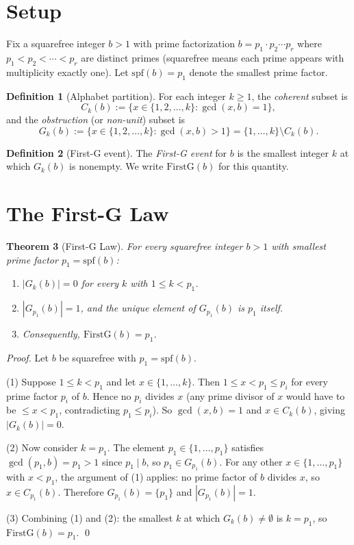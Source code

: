 \documentclass[11pt,reqno]{amsart}
\theoremstyle{plain}
\newtheorem{theorem}{Theorem}
\theoremstyle{definition}
\newtheorem{definition}[theorem]{Definition}
\begin{document}
\section{Setup}

Fix a squarefree integer $b > 1$ with prime factorization
$b = p_1 \cdot p_2 \cdots p_r$ where $p_1 < p_2 < \cdots < p_r$
are distinct primes (squarefree means each prime appears with
multiplicity exactly one). Let $\mathrm{spf}(b) = p_1$ denote the
smallest prime factor.

\begin{definition}[Alphabet partition]
For each integer $k \geq 1$, the \emph{coherent} subset is
\[
C_k(b) := \{x \in \{1, 2, \ldots, k\} : \gcd(x, b) = 1\},
\]
and the \emph{obstruction} (or \emph{non-unit}) subset is
\[
G_k(b) := \{x \in \{1, 2, \ldots, k\} : \gcd(x, b) > 1\}
        = \{1, \ldots, k\} \setminus C_k(b).
\]
\end{definition}

\begin{definition}[First-G event]
The \emph{First-G event} for $b$ is the smallest integer $k$ at
which $G_k(b)$ is nonempty. We write $\mathrm{FirstG}(b)$ for this
quantity.
\end{definition}

\section{The First-G Law}

\begin{theorem}[First-G Law]\label{thm:firstG}
For every squarefree integer $b > 1$ with smallest prime factor
$p_1 = \mathrm{spf}(b)$:
\begin{enumerate}
\item $|G_k(b)| = 0$ for every $k$ with $1 \leq k < p_1$.
\item $|G_{p_1}(b)| = 1$, and the unique element of $G_{p_1}(b)$
is $p_1$ itself.
\item Consequently, $\mathrm{FirstG}(b) = p_1$.
\end{enumerate}
\end{theorem}

\begin{proof}
Let $b$ be squarefree with $p_1 = \mathrm{spf}(b)$.

(1) Suppose $1 \leq k < p_1$ and let $x \in \{1, \ldots, k\}$.
Then $1 \leq x < p_1 \leq p_i$ for every prime factor $p_i$ of
$b$. Hence no $p_i$ divides $x$ (any prime divisor of $x$ would
have to be $\leq x < p_1$, contradicting $p_1 \leq p_i$). So
$\gcd(x, b) = 1$ and $x \in C_k(b)$, giving $|G_k(b)| = 0$.

(2) Now consider $k = p_1$. The element $p_1 \in \{1, \ldots, p_1\}$
satisfies $\gcd(p_1, b) = p_1 > 1$ since $p_1 \mid b$, so
$p_1 \in G_{p_1}(b)$. For any other $x \in \{1, \ldots, p_1\}$
with $x < p_1$, the argument of (1) applies: no prime factor of $b$
divides $x$, so $x \in C_{p_1}(b)$. Therefore $G_{p_1}(b) = \{p_1\}$
and $|G_{p_1}(b)| = 1$.

(3) Combining (1) and (2): the smallest $k$ at which $G_k(b) \neq
\emptyset$ is $k = p_1$, so $\mathrm{FirstG}(b) = p_1$. \qed
\end{proof}
\end{document}

